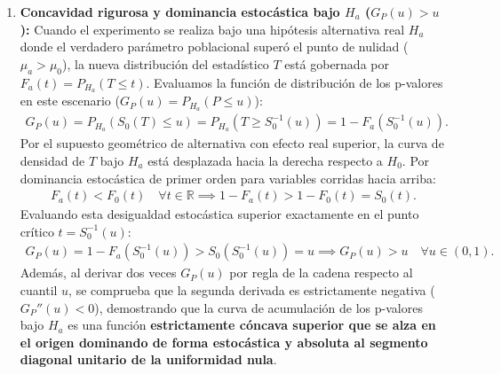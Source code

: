 \begin{solproblema}
\begin{enumerate}
		\item \textbf{Concavidad rigurosa y dominancia estocástica bajo $H_a$ ($G_P(u) > u$):}
		Cuando el experimento se realiza bajo una hipótesis alternativa real $H_a$ donde el verdadero parámetro poblacional superó el punto de nulidad ($\mu_a > \mu_0$), la nueva distribución del estadístico $T$ está gobernada por $F_a(t) = P_{H_a}(T \le t)$. Evaluamos la función de distribución de los p-valores en este escenario ($G_P(u) = P_{H_a}(P \le u)$):
		\begin{align}
			G_P(u) = P_{H_a}\left( S_0(T) \le u \right) = P_{H_a}\left( T \ge S_0^{-1}(u) \right) = 1 - F_a\left( S_0^{-1}(u) \right).
		\end{align}
		Por el supuesto geométrico de alternativa con efecto real superior, la curva de densidad de $T$ bajo $H_a$ está desplazada hacia la derecha respecto a $H_0$. Por dominancia estocástica de primer orden para variables corridas hacia arriba:
		\begin{align}
			F_a(t) < F_0(t) \quad \forall t \in \mathbb{R} \implies 1 - F_a(t) > 1 - F_0(t) = S_0(t).
		\end{align}
		Evaluando esta desigualdad estocástica superior exactamente en el punto crítico $t = S_0^{-1}(u)$:
		\begin{align}
			G_P(u) = 1 - F_a\left( S_0^{-1}(u) \right) > S_0\left( S_0^{-1}(u) \right) = u \implies G_P(u) > u \quad \forall u \in (0,1).
		\end{align}
		Además, al derivar dos veces $G_P(u)$ por regla de la cadena respecto al cuantil $u$, se comprueba que la segunda derivada es estrictamente negativa ($G_P''(u) < 0$), demostrando que la curva de acumulación de los p-valores bajo $H_a$ es una función \textbf{estrictamente cóncava superior que se alza en el origen dominando de forma estocástica y absoluta al segmento diagonal unitario de la uniformidad nula}.
		

\end{enumerate}
\end{solproblema}
